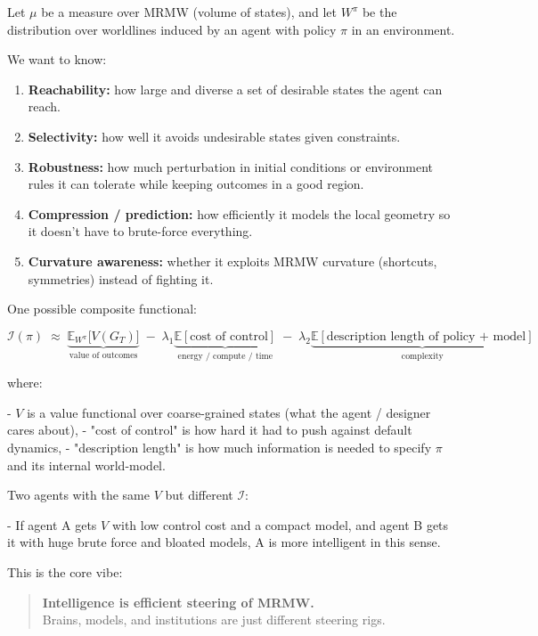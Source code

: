 Let $\mu$ be a measure over MRMW (volume of states), and let $W^\pi$ be the
distribution over worldlines induced by an agent with policy $\pi$ in an environment.

We want to know:

\begin{enumerate}
  \item \textbf{Reachability:} how large and diverse a set of desirable states the agent can reach.

  \item \textbf{Selectivity:} how well it avoids undesirable states given constraints.

  \item \textbf{Robustness:} how much perturbation in initial conditions or environment rules it can tolerate while keeping outcomes in a good region.

  \item \textbf{Compression / prediction:} how efficiently it models the local geometry so it doesn’t have to brute-force everything.

  \item \textbf{Curvature awareness:} whether it exploits MRMW curvature (shortcuts, symmetries) instead of fighting it.
\end{enumerate}

One possible composite functional:

\[
  \mathcal{I}(\pi) \;\approx\;
  \underbrace{\mathbb{E}_{W^\pi}\big[ V(G_T) \big]}_{\text{value of outcomes}}
  \;-\;
  \lambda_1 \underbrace{\mathbb{E}[ \text{cost of control} ]}_{\text{energy / compute / time}}
  \;-\;
  \lambda_2 \underbrace{\mathbb{E}[ \text{description length of policy + model} ]}_{\text{complexity}}
\]

where:

- $V$ is a value functional over coarse-grained states (what the agent / designer cares about),
- "cost of control" is how hard it had to push against default dynamics,
- "description length" is how much information is needed to specify $\pi$ and its internal world-model.

Two agents with the same $V$ but different $\mathcal{I}$:

- If agent A gets $V$ with low control cost and a compact model, and agent B gets it with huge brute force and bloated models, A is more intelligent in this sense.

This is the core vibe:

\begin{quote}
\textbf{Intelligence is efficient steering of MRMW.}\\
Brains, models, and institutions are just different steering rigs.
\end{quote}


